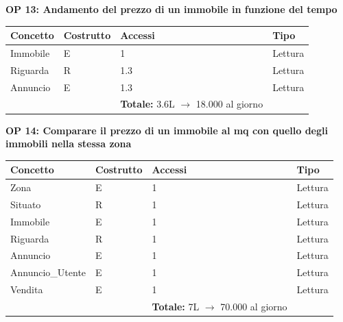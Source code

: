 \documentclass[a4paper,12pt]{report}
\begin{document}
             \textbf{OP 13: Andamento del prezzo di un immobile in funzione del tempo}
        	\begin{table}[H]
            \centering
             \begin{tabular}{llll}
             \rowcolor{yellow!20} \textbf{Concetto} & \textbf{Costrutto} & \textbf{Accessi} & \textbf{Tipo}\\ [0.5ex] 
             \hline
             Immobile & E & 1 & Lettura \\ 
             Riguarda & R & 1.3 & Lettura \\ 
             Annuncio & E & 1.3 & Lettura \\ 
             \hline
                \rowcolor{yellow!20} &   & \textbf{Totale:} 3.6L $\rightarrow$ 18.000 al giorno &  \\ [1ex] 
             
             \end{tabular}
            \end{table}

            \textbf{OP 14: Comparare il prezzo di un immobile al mq con quello degli immobili nella stessa zona}
        	\begin{table}[H]
            \centering
             \begin{tabular}{llll}
             \rowcolor{yellow!20} \textbf{Concetto} & \textbf{Costrutto} & \textbf{Accessi} & \textbf{Tipo}\\ [0.5ex] 
             \hline
             Zona & E & 1 & Lettura \\ 
             Situato & R & 1 & Lettura \\ 
             Immobile & E & 1 & Lettura \\ 
             Riguarda & R & 1 & Lettura \\ 
             Annuncio & E & 1 & Lettura \\ 
             Annuncio\_Utente & E & 1 & Lettura \\ 
             Vendita & E & 1 & Lettura \\ 
             \hline
                \rowcolor{yellow!20} &   & \textbf{Totale:} 7L $\rightarrow$ 70.000 al giorno &  \\ [1ex] 
             
             \end{tabular}
            \end{table}
\end{document}
